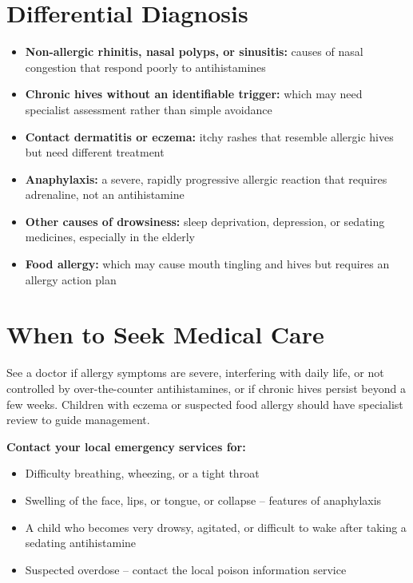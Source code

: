 \section*{Differential Diagnosis}
\begin{itemize}
    \item \textbf{Non-allergic rhinitis, nasal polyps, or sinusitis:} causes of nasal congestion that respond poorly to antihistamines
    \item \textbf{Chronic hives without an identifiable trigger:} which may need specialist assessment rather than simple avoidance
    \item \textbf{Contact dermatitis or eczema:} itchy rashes that resemble allergic hives but need different treatment
    \item \textbf{Anaphylaxis:} a severe, rapidly progressive allergic reaction that requires adrenaline, not an antihistamine
    \item \textbf{Other causes of drowsiness:} sleep deprivation, depression, or sedating medicines, especially in the elderly
    \item \textbf{Food allergy:} which may cause mouth tingling and hives but requires an allergy action plan
\end{itemize}

\section*{When to Seek Medical Care}
See a doctor if allergy symptoms are severe, interfering with daily life, or not controlled by over-the-counter antihistamines, or if chronic hives persist beyond a few weeks. Children with eczema or suspected food allergy should have specialist review to guide management.

\textbf{Contact your local emergency services for:}
\begin{itemize}
    \item Difficulty breathing, wheezing, or a tight throat
    \item Swelling of the face, lips, or tongue, or collapse -- features of anaphylaxis
    \item A child who becomes very drowsy, agitated, or difficult to wake after taking a sedating antihistamine
    \item Suspected overdose -- contact the local poison information service
\end{itemize}

